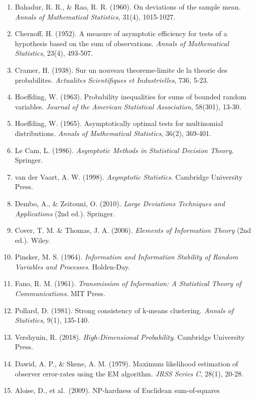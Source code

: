 \documentclass[
  12pt,
]{ctexart}
\providecommand{\tightlist}{%
  \setlength{\itemsep}{0pt}\setlength{\parskip}{0pt}}
\begin{document}
\begin{enumerate}
\def\labelenumi{\arabic{enumi}.}
\tightlist
\item
  Bahadur, R. R., \& Rao, R. R. (1960). On deviations of the sample
  mean. \emph{Annals of Mathematical Statistics}, 31(4), 1015-1027.
\item
  Chernoff, H. (1952). A measure of asymptotic efficiency for tests of a
  hypothesis based on the sum of observations. \emph{Annals of
  Mathematical Statistics}, 23(4), 493-507.
\item
  Cramer, H. (1938). Sur un nouveau theoreme-limite de la theorie des
  probabilites. \emph{Actualites Scientifiques et Industrielles}, 736,
  5-23.
\item
  Hoeffding, W. (1963). Probability inequalities for sums of bounded
  random variables. \emph{Journal of the American Statistical
  Association}, 58(301), 13-30.
\item
  Hoeffding, W. (1965). Asymptotically optimal tests for multinomial
  distributions. \emph{Annals of Mathematical Statistics}, 36(2),
  369-401.
\item
  Le Cam, L. (1986). \emph{Asymptotic Methods in Statistical Decision
  Theory}. Springer.
\item
  van der Vaart, A. W. (1998). \emph{Asymptotic Statistics}. Cambridge
  University Press.
\item
  Dembo, A., \& Zeitouni, O. (2010). \emph{Large Deviations Techniques
  and Applications} (2nd ed.). Springer.
\item
  Cover, T. M. \& Thomas, J. A. (2006). \emph{Elements of Information
  Theory} (2nd ed.). Wiley.
\item
  Pinsker, M. S. (1964). \emph{Information and Information Stability of
  Random Variables and Processes}. Holden-Day.
\item
  Fano, R. M. (1961). \emph{Transmission of Information: A Statistical
  Theory of Communications}. MIT Press.
\item
  Pollard, D. (1981). Strong consistency of k-means clustering.
  \emph{Annals of Statistics}, 9(1), 135-140.
\item
  Vershynin, R. (2018). \emph{High-Dimensional Probability}. Cambridge
  University Press.
\item
  Dawid, A. P., \& Skene, A. M. (1979). Maximum likelihood estimation of
  observer error-rates using the EM algorithm. \emph{JRSS Series C},
  28(1), 20-28.
\item
  Aloise, D., et al.~(2009). NP-hardness of Euclidean sum-of-squares

\end{enumerate}
\end{document}
